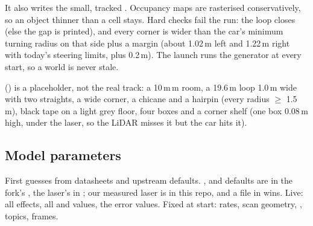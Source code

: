 \documentclass[11pt,a4paper]{article}
\begin{document}
It also writes the small, tracked . Occupancy maps are rasterised conservatively, so an object thinner than a cell stays. Hard checks fail the run: the loop closes (else the gap is printed), and every corner is wider than the car's minimum turning radius on that side plus a margin (about 1.02\,m left and 1.22\,m right with today's steering limits, plus 0.2\,m). The launch runs the generator at every start, so a world is never stale.

 () is a placeholder, not the real track: a 10\,m\,m room, a 19.6\,m loop 1.0\,m wide with two straights, a wide corner, a chicane and a hairpin (every radius $\geq$ 1.5\,m), black tape on a light grey floor, four boxes and a corner shelf (one box 0.08\,m high, under the laser, so the LiDAR misses it but the car hits it).

\subsection{Model parameters}
First guesses from datasheets and upstream defaults. ,  and  defaults are in the fork's , the laser's in ; our measured laser is  in this repo, and a file in  wins. Live: all  effects, all  and  values, the  error values. Fixed at start: rates, scan geometry, , topics, frames.
\end{document}
